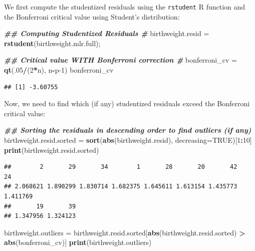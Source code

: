 \documentclass[
]{book}
\newenvironment{Shaded}{\begin{snugshade}}{\end{snugshade}}
\newcommand{\AttributeTok}[1]{\textcolor[rgb]{0.13,0.29,0.53}{#1}}
\newcommand{\ConstantTok}[1]{\textcolor[rgb]{0.56,0.35,0.01}{#1}}
\newcommand{\DecValTok}[1]{\textcolor[rgb]{0.00,0.00,0.81}{#1}}
\newcommand{\DocumentationTok}[1]{\textcolor[rgb]{0.56,0.35,0.01}{\textbf{\textit{#1}}}}
\newcommand{\FunctionTok}[1]{\textcolor[rgb]{0.13,0.29,0.53}{\textbf{#1}}}
\newcommand{\NormalTok}[1]{#1}
\newcommand{\OtherTok}[1]{\textcolor[rgb]{0.56,0.35,0.01}{#1}}
\newcommand{\SpecialCharTok}[1]{\textcolor[rgb]{0.81,0.36,0.00}{\textbf{#1}}}
\begin{document}
We first compute the studentized residuals using the \texttt{rstudent} R function and the Bonferroni critical value using Student's distribution:

\begin{Shaded}
\begin{Highlighting}[]
\DocumentationTok{\#\# Computing Studentized Residuals \#}
\NormalTok{birthweight.resid }\OtherTok{=} \FunctionTok{rstudent}\NormalTok{(birthweight.mlr.full); }

\DocumentationTok{\#\# Critical value WITH Bonferroni correction \#}
\NormalTok{bonferroni\_cv }\OtherTok{=} \FunctionTok{qt}\NormalTok{(.}\DecValTok{05}\SpecialCharTok{/}\NormalTok{(}\DecValTok{2}\SpecialCharTok{*}\NormalTok{n), n}\SpecialCharTok{{-}}\NormalTok{p}\DecValTok{{-}1}\NormalTok{) }
\NormalTok{bonferroni\_cv}
\end{Highlighting}
\end{Shaded}

\begin{verbatim}
## [1] -3.60755
\end{verbatim}

Now, we need to find which (if any) studentized residuals exceed the Bonferroni critical value:

\begin{Shaded}
\begin{Highlighting}[]
\DocumentationTok{\#\# Sorting the residuals in descending order to find outliers (if any) }
\NormalTok{birthweight.resid.sorted }\OtherTok{=} \FunctionTok{sort}\NormalTok{(}\FunctionTok{abs}\NormalTok{(birthweight.resid), }\AttributeTok{decreasing=}\ConstantTok{TRUE}\NormalTok{)[}\DecValTok{1}\SpecialCharTok{:}\DecValTok{10}\NormalTok{]}
\FunctionTok{print}\NormalTok{(birthweight.resid.sorted)}
\end{Highlighting}
\end{Shaded}

\begin{verbatim}
##        2       29       34        1       28       20       42       24 
## 2.068621 1.890299 1.830714 1.682375 1.645611 1.613154 1.435773 1.411769 
##       19       39 
## 1.347956 1.324123
\end{verbatim}

\begin{Shaded}
\begin{Highlighting}[]
\NormalTok{birthweight.outliers }\OtherTok{=}\NormalTok{ birthweight.resid.sorted[}\FunctionTok{abs}\NormalTok{(birthweight.resid.sorted) }\SpecialCharTok{\textgreater{}} \FunctionTok{abs}\NormalTok{(bonferroni\_cv)]}
\FunctionTok{print}\NormalTok{(birthweight.outliers)}
\end{Highlighting}
\end{Shaded}
\end{document}
